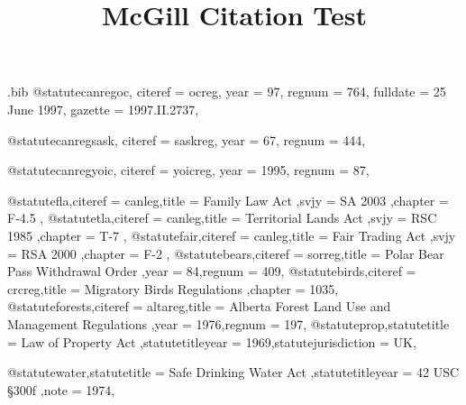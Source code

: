 \begin{filecontents*}{\jobname.bib}
@statute{canregoc,
citeref = {ocreg},
year = {97},
regnum = {764},
fulldate = {25 June 1997},
gazette = {1997.II.2737},
}

@statute{canregsask,
citeref = {saskreg},
year = {67},
regnum = {444},
}

@statute{canregyoic,
citeref = {yoicreg},
year = {1995},
regnum = {87},
}


@statute{fla,citeref = {canleg},title = {Family Law Act },svjy = {SA 2003 },chapter = {F-4.5 },}
@statute{tla,citeref = {canleg},title = {Territorial Lands Act },svjy = {RSC 1985 },chapter = {T-7 },}
@statute{fair,citeref = {canleg},title = {Fair Trading Act },svjy = {RSA 2000 },chapter = {F-2 },}
@statute{bears,citeref = {sorreg},title = {Polar Bear Pass Withdrawal Order },year = {84},regnum = {409},}
@statute{birds,citeref = {crcreg},title = {Migratory Birds Regulations },chapter = {1035},}
@statute{forests,citeref = {altareg},title = {Alberta Forest Land Use and Management Regulations },year = {1976},regnum = {197},}
@statute{prop,statutetitle = {Law of Property Act },statutetitleyear = {1969},statutejurisdiction = {UK},}

@statute{water,statutetitle = {Safe Drinking Water Act },statutetitleyear = {42 USC §300f },note = {1974},}




\end{filecontents*}




\documentclass[12pt]{article}
\newcommand\rulesep{\rule{0.4\textwidth}{.4pt}}

\title{McGill Citation Test}
\author{}
\date{}
\long\gdef{}
\usepackage[table]{xcolor}
\pagecolor{blue!3}
\usepackage{fontspec}
\setmainfont{Noto Serif}
\setsansfont{TeX Gyre Schola}[Scale=1.2]%
\setmonofont{Noto Sans Mono}%
\usepackage[british]{babel}
\usepackage{csquotes}
\usepackage{graphicx}

\usepackage{marginnote}
\usepackage{abstract}
\usepackage{microtype}

\newcommand\note[1]{(\texttt{#1})}


\newcommand\egcasename{Donoghue v Stevenson}
\newcommand\egcaseref{[1932] AC 562}


